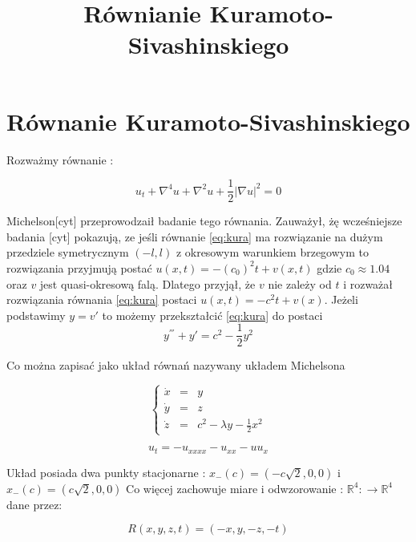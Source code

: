 \title{Równianie Kuramoto-Sivashinskiego}

\section{Równanie Kuramoto-Sivashinskiego}
Rozważmy równanie :


\begin{equation}\label{eq:kura}
  u_t + \nabla^4u + \nabla^2u + \frac{1}{2}| \nabla u|^2 = 0
 \end{equation}

Michelson[cyt] przeprowodzaił badanie tego równania. Zauważył, żę wcześniejsze badania [cyt] pokazują, ze jeśli równanie \ref{eq:kura} 
ma rozwiązanie na dużym przedziele symetrycznym $ (-l,l) $ z okresowym warunkiem brzegowym to rozwiązania przyjmują postać 
$ u(x,t) = -(c_0)^2t + v(x,t) $ gdzie $ c_0 \approx 1.04 $ oraz $ v $ jest quasi-okresową falą. Dlatego przyjął, że $ v $ nie zależy od 
$ t $ i rozważał rozwiązania równania \ref{eq:kura} postaci $ u(x,t) = - c^2t + v(x) $. Jeżeli podstawimy $ y = v'$ to możemy przekształcić \ref{eq:kura}
do postaci 
\begin{equation}
\label{eq:jednazmienna}
  y^{'''} + y' = c^2 - \frac{1}{2}y^2
\end{equation}

Co można zapisać jako układ równań nazywany układem Michelsona

\begin{equation}\label{eq:michealsonSystem}
\left\{
    \begin{array}{rcl}
        \dot x &=& y\\
        \dot y &=& z\\
        \dot z &=& c^2 - \lambda y -\frac{1}{2}x^2
    \end{array}
\right.
\end{equation}



$$
  u_t = -u_{xxxx} - u_{xx} -uu_x
$$


Układ posiada dwa punkty stacjonarne : $x_{-}(c) = (-c\sqrt{2},0,0) $ i $x_{-}(c) = (c\sqrt{2},0,0)$
Co więcej zachowuje miare i odwzorowanie : $ {\mathbb R} ^4: \to {\mathbb R}^4 $ dane przez:

\begin{equation}
   R(x,y,z,t) = (-x,y,-z,-t)
\end{equation}


